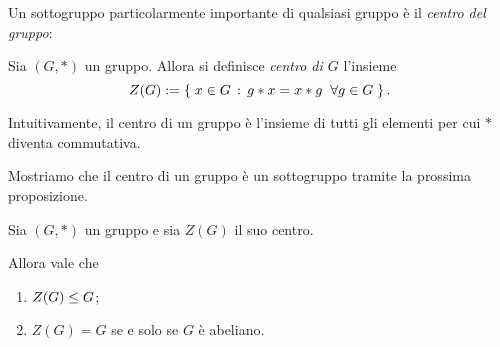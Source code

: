 Un sottogruppo particolarmente importante di qualsiasi gruppo è il \emph{centro del gruppo}:

\begin{definition}
     \label{def:centro}
    Sia $(G, *)$ un gruppo. Allora si definisce \emph{centro di $G$} l'insieme \[
        Z(G) := \left\{\;x \in G \,:\, g*x = x*g \;\;\forall g \in G\;\right\}.    
    \]
\end{definition}

Intuitivamente, il centro di un gruppo è l'insieme di tutti gli elementi per cui $*$ diventa commutativa.

Mostriamo che il centro di un gruppo è un sottogruppo tramite la prossima proposizione.

\begin{proposition}
    \label{prop:centro}
    Sia $(G, *)$ un gruppo e sia $Z(G)$ il suo centro.

    Allora vale che \begin{enumerate}[label={(\roman*)}, ref={\theproposition: (\roman*)}]
        \item $Z(G) \leq G$;
        \item $Z(G) = G$ se e solo se $G$ è abeliano.
    \end{enumerate}
\end{proposition}
